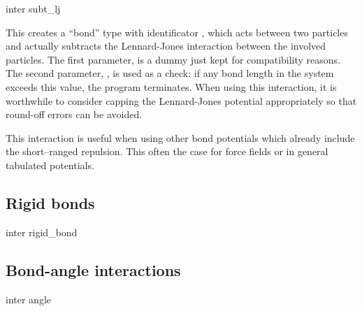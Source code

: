 \begin{essyntax}
  inter 
  subt_lj
   
\end{essyntax}
This creates a ``bond'' type with identificator , which
acts between two particles and actually subtracts the Lennard-Jones interaction
between the involved particles.  The first parameter,  is a dummy
just kept for compatibility reasons. The second parameter, , is used as a
check: if any bond length in the system exceeds this value, the program
terminates. When using this interaction, it is worthwhile to consider
capping the Lennard-Jones potential appropriately so that round-off errors can
be avoided.

This interaction is useful when using other bond potentials which already
include the short--ranged repulsion. This often the case for force fields or in
general tabulated potentials.

\subsection{Rigid bonds}

\begin{essyntax}
  inter 
  rigid_bond
    
\end{essyntax}

\subsection{Bond-angle interactions}
\label{sec:angle}

\begin{essyntax}
  inter 
  angle  
  \begin{features}
  \end{features}
\end{essyntax}


